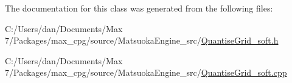 The documentation for this class was generated from the following files\+:\begin{DoxyCompactItemize}
\item 
C\+:/\+Users/dan/\+Documents/\+Max 7/\+Packages/max\+\_\+cpg/source/\+Matsuoka\+Engine\+\_\+src/\hyperlink{QuantiseGrid__soft_8h}{Quantise\+Grid\+\_\+soft.\+h}\item 
C\+:/\+Users/dan/\+Documents/\+Max 7/\+Packages/max\+\_\+cpg/source/\+Matsuoka\+Engine\+\_\+src/\hyperlink{QuantiseGrid__soft_8cpp}{Quantise\+Grid\+\_\+soft.\+cpp}\end{DoxyCompactItemize}
